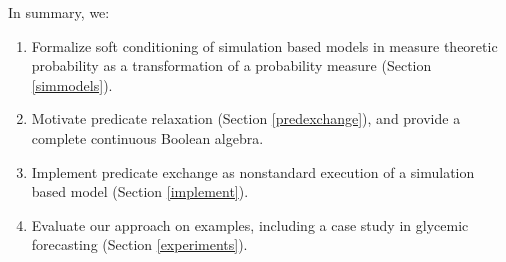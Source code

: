 In summary, we:

\begin{enumerate}
	\item Formalize soft conditioning of simulation based  models in measure theoretic probability as a transformation of a probability measure (Section \ref{simmodels}).
	\item Motivate predicate relaxation (Section \ref{predexchange}), and provide a complete continuous Boolean algebra.
	\item Implement predicate exchange as nonstandard execution of a simulation based model (Section \ref{implement}).
	\item Evaluate our approach on examples, including a case study in glycemic forecasting (Section \ref{experiments}).
\end{enumerate}



